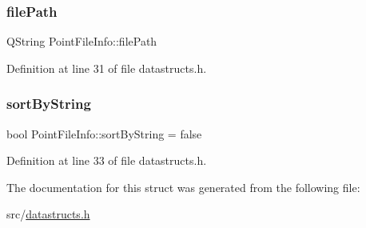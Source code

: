 \mbox{\label{struct_point_file_info_a40c7f6eb65abb4cd4f0a51b17e6df1f0}} 
\subsubsection{\texorpdfstring{filePath}{filePath}}
{\footnotesize\ttfamily Q\+String Point\+File\+Info\+::file\+Path}



Definition at line 31 of file datastructs.\+h.

\mbox{\label{struct_point_file_info_a48b211df434193da7280b689bd2d39ef}} 
\subsubsection{\texorpdfstring{sortByString}{sortByString}}
{\footnotesize\ttfamily bool Point\+File\+Info\+::sort\+By\+String = false}



Definition at line 33 of file datastructs.\+h.



The documentation for this struct was generated from the following file\+:\begin{DoxyCompactItemize}
\item 
src/\mbox{\hyperlink{datastructs_8h}{datastructs.\+h}}\end{DoxyCompactItemize}

